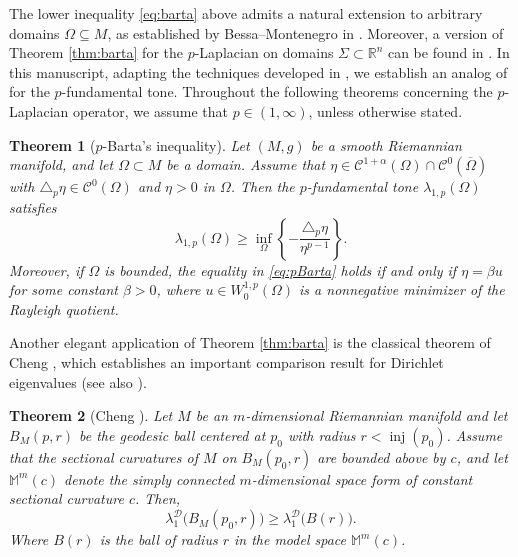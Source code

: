\documentclass{article}
\newtheorem{theorem}{Theorem}[section]
\begin{document}
The lower inequality \eqref{eq:barta} above admits a natural extension to arbitrary  domains $\Omega \subseteq M$, as established by Bessa--Montenegro in \cite{BessaMontenegro}. Moreover, a version of Theorem \ref{thm:barta} for the $p$-Laplacian on domains $\Sigma \subset \mathbb{R}^n$ can be found in \cite[Section 2.2] {AllegrettoHuang1998}. In this manuscript, adapting the techniques developed in
\cite{AllegrettoHuang1998, BessaMontenegro}, we establish an analog of \cite[Proposition 2.1]{BessaMontenegro} for the $p$-fundamental tone. Throughout the following theorems concerning the $p$-Laplacian operator, we assume that $p \in (1,\infty)$, unless otherwise stated.


\begin{theorem}[$p$-Barta's inequality]\label{thm:pbarta} Let $(M,g)$ be a smooth Riemannian manifold, and let $\Omega \subset M$ be a domain. Assume that $\eta \in \mathcal{C}^{1+\alpha}(\Omega)\cap\mathcal{C}^{0}(\overline{\Omega})$ with $\triangle_p \eta \in \mathcal{C}^0(\Omega)$
and $\eta>0$ in $\Omega$.
Then the $p$-fundamental tone $\lambda_{1,p}(\Omega)$ satisfies
\begin{equation}\label{eq:pBarta}
\lambda_{1,p}(\Omega)
\ge
\inf_{\Omega}
\left\{
-\frac{\triangle_p \eta}{\eta^{p-1}}
\right\}.
\end{equation}
Moreover, if $\Omega$ is bounded, the equality in \eqref{eq:pBarta}
holds if and only if $\eta=\beta u$ for some constant $\beta>0$,
where $u \in W^{1,p}_0(\Omega)$ is a nonnegative minimizer of the Rayleigh quotient.
\end{theorem}

Another elegant application of Theorem \eqref{thm:barta} is the classical theorem of Cheng \cite{Cheng1975}, which establishes an important comparison result for Dirichlet eigenvalues (see also \cite[Theorem 1.3]{BessaMontenegro}).


\begin{theorem}[Cheng \cite{Cheng1975}] \label{thm:cheng} Let $M$ be an $m$-dimensional Riemannian manifold and let $B_M(p,r)$ be the geodesic ball centered at $p_0$ with radius $r<\operatorname{inj}(p_0)$.  
Assume that the sectional curvatures of $M$ on $B_M(p_0,r)$ are bounded above by $c$, and let  $\mathbb{M}^m(c)$ denote the simply connected $m$-dimensional space form of constant sectional curvature $c$. 
Then,
\begin{equation}
\lambda_1^{\mathcal{D}} \big( B_M(p_0,r) \big) \ge \lambda_1^{\mathcal{D}} \big(B(r) \big).
\end{equation}
Where $B(r)$ is the ball of radius $r$ in the model space $\mathbb{M}^m(c)$.
\end{theorem}
\end{document}
